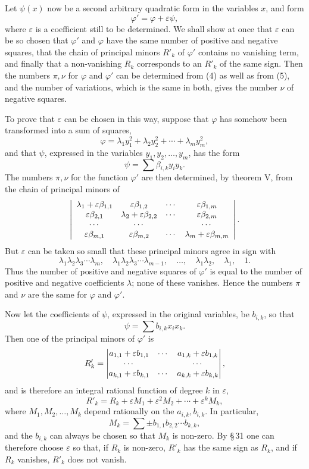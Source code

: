 \documentclass[11pt]{article}
\begin{document}
Let $\psi(x)$ now be a second arbitrary quadratic form in the variables $x$, and form
\begin{equation}
        \varphi'=\varphi+\varepsilon\psi,
\tag{6}
\end{equation}
where $\varepsilon$ is a coefficient still to be determined. We shall show at once that $\varepsilon$ can be so chosen that $\varphi'$ and $\varphi$ have the same number of positive and negative squares, that the chain of principal minors $R'_k$ of $\varphi'$ contains no vanishing term, and finally that a non-vanishing $R_k$ corresponds to an $R'_k$ of the same sign. Then the numbers $\pi,\nu$ for $\varphi$ and $\varphi'$ can be determined from (4) as well as from (5), and the number of variations, which is the same in both, gives the number $\nu$ of negative squares.

To prove that $\varepsilon$ can be chosen in this way, suppose that $\varphi$ has somehow been transformed into a sum of squares,
\[
        \varphi=\lambda_1y_1^2+\lambda_2y_2^2+\cdots+\lambda_my_m^2,
\]
and that $\psi$, expressed in the variables $y_1,y_2,
\ldots,y_m$, has the form
\[
        \psi=\sum \beta_{i,k}y_i y_k.
\]
The numbers $\pi,\nu$ for the function $\varphi'$ are then determined, by theorem V, from the chain of principal minors of
\[
\left|\begin{array}{cccc}
 \lambda_1+\varepsilon\beta_{1,1}&\varepsilon\beta_{1,2}&\cdots&\varepsilon\beta_{1,m}\cr
 \varepsilon\beta_{2,1}&\lambda_2+\varepsilon\beta_{2,2}&\cdots&\varepsilon\beta_{2,m}\cr
 \cdots&\cdots&&\cdots\cr
 \varepsilon\beta_{m,1}&\varepsilon\beta_{m,2}&\cdots&\lambda_m+\varepsilon\beta_{m,m}
\end{array}\right|.
\]
But $\varepsilon$ can be taken so small that these principal minors agree in sign with
\[
\lambda_1\lambda_2\lambda_3\cdots\lambda_m,
\quad
\lambda_1\lambda_2\lambda_3\cdots\lambda_{m-1},
\quad\ldots,
\quad
\lambda_1\lambda_2,
\quad \lambda_1,
\quad 1.
\]
Thus the number of positive and negative squares of $\varphi'$ is equal to the number of positive and negative coefficients $\lambda$; none of these vanishes. Hence the numbers $\pi$ and $\nu$ are the same for $\varphi$ and $\varphi'$.

Now let the coefficients of $\psi$, expressed in the original variables, be $b_{i,k}$, so that
\[
        \psi=\sum b_{i,k}x_i x_k.
\]
Then one of the principal minors of $\varphi'$ is
\[
        R'_k=\begin{vmatrix}
        a_{1,1}+\varepsilon b_{1,1}&\cdots&a_{1,k}+\varepsilon b_{1,k}\cr
        \cdots&&\cdots\cr
        a_{k,1}+\varepsilon b_{k,1}&\cdots&a_{k,k}+\varepsilon b_{k,k}
        \end{vmatrix},
\]
and is therefore an integral rational function of degree $k$ in $\varepsilon$,
\[
        R'_k=R_k+\varepsilon M_1+\varepsilon^2M_2+
\cdots+\varepsilon^kM_k,
\]
where $M_1,M_2,
\ldots,M_k$ depend rationally on the $a_{i,k},b_{i,k}$. In particular,
\[
        M_k=\sum \pm b_{1,1}b_{2,2}\cdots b_{k,k},
\]
and the $b_{i,k}$ can always be chosen so that $M_k$ is non-zero. By \S\,31 one can therefore choose $\varepsilon$ so that, if $R_k$ is non-zero, $R'_k$ has the same sign as $R_k$, and if $R_k$ vanishes, $R'_k$ does not vanish.
\end{document}
